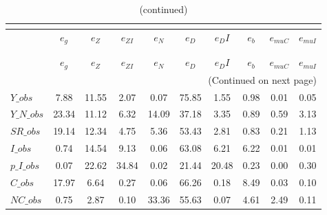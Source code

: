  
\begin{center}
\begin{longtable}{lccccccccc} 
\caption{VARIANCE DECOMPOSITION (in percent)}\\
 \label{Table:th_var_decomp_uncond}\\
\toprule 
$               $	 & 	 $        {e_g}$	 & 	 $        {e_Z}$	 & 	 $     {e_{ZI}}$	 & 	 $        {e_N}$	 & 	 $        {e_D}$	 & 	 $       {e_DI}$	 & 	 $        {e_b}$	 & 	 $    {e_{muC}}$	 & 	 $    {e_{muI}}$\\
\midrule \endfirsthead 
\caption{(continued)}\\
 \toprule \\ 
$               $	 & 	 $        {e_g}$	 & 	 $        {e_Z}$	 & 	 $     {e_{ZI}}$	 & 	 $        {e_N}$	 & 	 $        {e_D}$	 & 	 $       {e_DI}$	 & 	 $        {e_b}$	 & 	 $    {e_{muC}}$	 & 	 $    {e_{muI}}$\\
\midrule \endhead 
\midrule \multicolumn{10}{r}{(Continued on next page)} \\ \bottomrule \endfoot 
\bottomrule \endlastfoot 
$Y\_obs         $	 & 	         7.88	 & 	        11.55	 & 	         2.07	 & 	         0.07	 & 	        75.85	 & 	         1.55	 & 	         0.98	 & 	         0.01	 & 	         0.05 \\ 
$Y\_N\_obs      $	 & 	        23.34	 & 	        11.12	 & 	         6.32	 & 	        14.09	 & 	        37.18	 & 	         3.35	 & 	         0.89	 & 	         0.59	 & 	         3.13 \\ 
$SR\_obs        $	 & 	        19.14	 & 	        12.34	 & 	         4.75	 & 	         5.36	 & 	        53.43	 & 	         2.81	 & 	         0.83	 & 	         0.21	 & 	         1.13 \\ 
$I\_obs         $	 & 	         0.74	 & 	        14.54	 & 	         9.13	 & 	         0.06	 & 	        63.08	 & 	         6.21	 & 	         6.22	 & 	         0.01	 & 	         0.01 \\ 
$p\_I\_obs      $	 & 	         0.07	 & 	        22.62	 & 	        34.84	 & 	         0.02	 & 	        21.44	 & 	        20.48	 & 	         0.23	 & 	         0.00	 & 	         0.30 \\ 
$C\_obs         $	 & 	        17.97	 & 	         6.64	 & 	         0.27	 & 	         0.06	 & 	        66.26	 & 	         0.18	 & 	         8.49	 & 	         0.03	 & 	         0.10 \\ 
$NC\_obs        $	 & 	         0.75	 & 	         2.87	 & 	         0.10	 & 	        33.36	 & 	        55.63	 & 	         0.07	 & 	         4.61	 & 	         2.49	 & 	         0.11 \\ 

\end{longtable}
\end{center}
